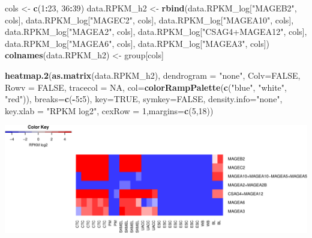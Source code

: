 \documentclass[]{article}
\newenvironment{Shaded}{\begin{snugshade}}{\end{snugshade}}
\newcommand{\KeywordTok}[1]{\textcolor[rgb]{0.13,0.29,0.53}{\textbf{#1}}}
\newcommand{\DataTypeTok}[1]{\textcolor[rgb]{0.13,0.29,0.53}{#1}}
\newcommand{\DecValTok}[1]{\textcolor[rgb]{0.00,0.00,0.81}{#1}}
\newcommand{\StringTok}[1]{\textcolor[rgb]{0.31,0.60,0.02}{#1}}
\newcommand{\OtherTok}[1]{\textcolor[rgb]{0.56,0.35,0.01}{#1}}
\newcommand{\OperatorTok}[1]{\textcolor[rgb]{0.81,0.36,0.00}{\textbf{#1}}}
\newcommand{\NormalTok}[1]{#1}
\begin{document}
\begin{Shaded}
\begin{Highlighting}[]
\NormalTok{cols <-}\StringTok{ }\KeywordTok{c}\NormalTok{(}\DecValTok{1}\OperatorTok{:}\DecValTok{23}\NormalTok{, }\DecValTok{36}\OperatorTok{:}\DecValTok{39}\NormalTok{)}
\NormalTok{data.RPKM_h2 <-}\StringTok{ }\KeywordTok{rbind}\NormalTok{(data.RPKM_log[}\StringTok{"MAGEB2"}\NormalTok{, cols], data.RPKM_log[}\StringTok{"MAGEC2"}\NormalTok{, cols],}
\NormalTok{                      data.RPKM_log[}\StringTok{"MAGEA10"}\NormalTok{, cols], data.RPKM_log[}\StringTok{"MAGEA2"}\NormalTok{, cols],}
\NormalTok{                      data.RPKM_log[}\StringTok{"CSAG4+MAGEA12"}\NormalTok{, cols], data.RPKM_log[}\StringTok{"MAGEA6"}\NormalTok{, cols],}
\NormalTok{                      data.RPKM_log[}\StringTok{"MAGEA3"}\NormalTok{, cols])}
\KeywordTok{colnames}\NormalTok{(data.RPKM_h2) <-}\StringTok{ }\NormalTok{group[cols]}

\KeywordTok{heatmap.2}\NormalTok{(}\KeywordTok{as.matrix}\NormalTok{(data.RPKM_h2), }\DataTypeTok{dendrogram =} \StringTok{"none"}\NormalTok{, }\DataTypeTok{Colv=}\OtherTok{FALSE}\NormalTok{, }\DataTypeTok{Rowv =} \OtherTok{FALSE}\NormalTok{,}
          \DataTypeTok{tracecol =} \OtherTok{NA}\NormalTok{, }\DataTypeTok{col=}\KeywordTok{colorRampPalette}\NormalTok{(}\KeywordTok{c}\NormalTok{(}\StringTok{"blue"}\NormalTok{, }\StringTok{"white"}\NormalTok{, }\StringTok{"red"}\NormalTok{)),}
          \DataTypeTok{breaks=}\KeywordTok{c}\NormalTok{(}\OperatorTok{-}\DecValTok{5}\OperatorTok{:}\DecValTok{5}\NormalTok{), }\DataTypeTok{key=}\OtherTok{TRUE}\NormalTok{, }\DataTypeTok{symkey=}\OtherTok{FALSE}\NormalTok{, }\DataTypeTok{density.info=}\StringTok{"none"}\NormalTok{,}
          \DataTypeTok{key.xlab =} \StringTok{"RPKM log2"}\NormalTok{, }\DataTypeTok{cexRow =} \DecValTok{1}\NormalTok{,}\DataTypeTok{margins=}\KeywordTok{c}\NormalTok{(}\DecValTok{5}\NormalTok{,}\DecValTok{18}\NormalTok{))}
\end{Highlighting}
\end{Shaded}

\includegraphics{Project_jankauskaite_ugne_files/figure-latex/unnamed-chunk-37-1.pdf}
\end{document}
